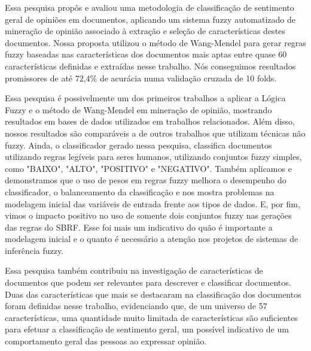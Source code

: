\documentclass[template.tex]{subfiles}
\begin{document}

Essa pesquisa propôs e avaliou  uma metodologia de classificação de sentimento geral de opiniões em documentos, aplicando um sistema fuzzy automatizado de mineração de opinião associado à extração e seleção de características destes documentos. Nossa proposta utilizou o método de Wang-Mendel \cite{wang1992generating} para gerar regras fuzzy baseadas nas características dos documentos mais aptas entre quase 60 características definidas e extraídas nesse trabalho. Nós conseguimos resultados promissores de até 72,4\% de acurácia numa validação cruzada de 10 folds.

Essa pesquisa é possivelmente um dos primeiros trabalhos a aplicar a Lógica Fuzzy e o método de Wang-Mendel em mineração de opinião, mostrando resultados em bases de dados utilizados em trabalhos relacionados. Além disso, nossos resultados são comparáveis a de outros trabalhos que utilizam técnicas não fuzzy. Ainda, o classificador gerado nessa pesquisa, classifica documentos utilizando regras legíveis para seres humanos, utilizando conjuntos fuzzy simples, como "BAIXO", "ALTO", "POSITIVO" e "NEGATIVO". Também aplicamos e demonstramos que o uso de pesos em regras fuzzy melhora o desempenho do classificador, o balanceamento da classificação e nos mostra problemas na modelagem inicial das variáveis de entrada frente aos tipos de dados. E, por fim, vimos o impacto positivo no uso de somente dois conjuntos fuzzy nas gerações das regras do SBRF. Esse foi mais um indicativo do quão é importante a modelagem inicial e o quanto é necessário a atenção nos projetos de sistemas de inferência fuzzy.


Essa pesquisa também contribuiu na investigação de características de documentos que podem ser relevantes para descrever e classificar documentos. Duas das características que mais se destacaram na classificação dos documentos foram definidas nesse trabalho, evidenciando que, de um universo de 57 características, uma quantidade muito limitada de características são suficientes para efetuar a classificação de sentimento geral, um possível indicativo de um comportamento geral das pessoas ao expressar opinião.
\end{document}
